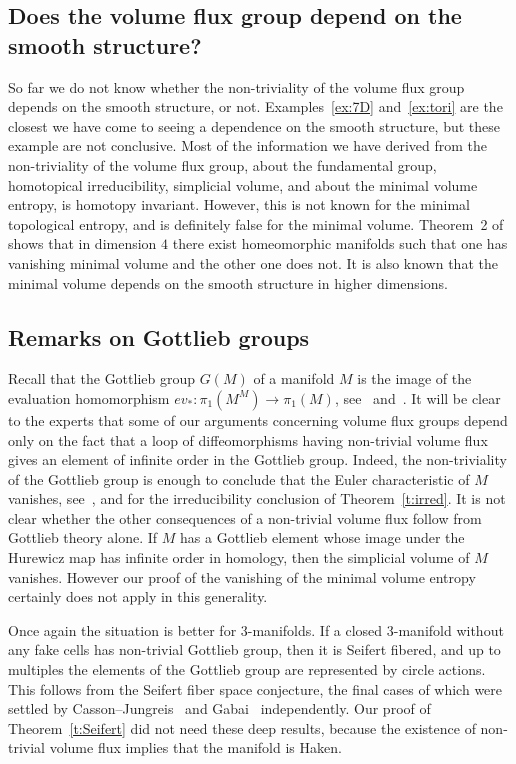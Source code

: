 \documentclass[12pt]{amsart}
\theoremstyle{definition}
\theoremstyle{remark}
\begin{document}
\subsection{Does the volume flux group depend on the smooth structure?}\label{ss}
   So far we do not know whether the non-triviality of the volume flux group depends 
   on the smooth structure, or not. Examples~\ref{ex:7D} and~\ref{ex:tori} are the 
   closest we have come to seeing a dependence on the smooth structure, but these 
   example are not conclusive. Most of the information we have derived from the non-triviality 
   of the volume flux group, about the fundamental group, homotopical irreducibility, 
   simplicial volume, and about the minimal volume entropy, is homotopy invariant. However, 
   this is not known for the minimal topological entropy, and is definitely false for the minimal volume. 
   Theorem~2 of~\cite{entropies} shows that in dimension $4$ there exist homeomorphic manifolds 
   such that one has vanishing minimal volume and the other one does not. It is also known that 
   the minimal volume depends on the smooth structure in higher dimensions.
   
\subsection{Remarks on Gottlieb groups}
Recall that the Gottlieb group $G(M)$ of a manifold $M$ is the image of the
evaluation homomorphism $ev_*\colon\pi_1(M^M)\longrightarrow\pi_1(M)$,
see~\cite{G0} and~\cite{LO,Oprea}. It will be clear to the experts that some 
of our arguments concerning volume flux groups depend only on the fact
that a loop of diffeomorphisms having non-trivial volume flux gives an element
of infinite order in the Gottlieb group. Indeed, the non-triviality of the Gottlieb group is 
enough to conclude that the Euler characteristic of $M$ vanishes, see~\cite{G0}, and for 
the irreducibility conclusion of Theorem~\ref{t:irred}. It is not clear whether 
the other consequences of a non-trivial volume flux follow from Gottlieb theory alone.
If $M$ has a Gottlieb element whose image under the Hurewicz map has infinite 
order in homology, then the simplicial volume of $M$ vanishes. However our proof 
of the vanishing of the minimal volume entropy certainly does not apply in this generality.
 
Once again the situation is better for $3$-manifolds. If a closed $3$-manifold without any 
fake cells has non-trivial Gottlieb group, then it is Seifert fibered, and up to multiples the
elements of the Gottlieb group are represented by circle actions. This follows 
from the Seifert fiber space conjecture, the final cases of which were settled by 
Casson--Jungreis~\cite{CJ} and Gabai~\cite{Gabai} independently. Our proof of 
Theorem~\ref{t:Seifert} did not need these deep results, because the existence of 
non-trivial volume flux implies that the manifold is Haken.
\end{document}
